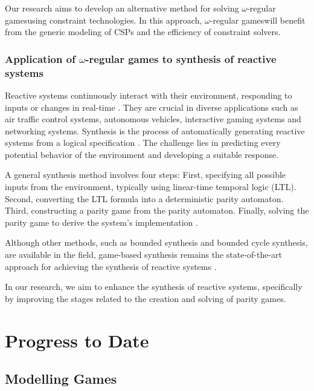 \documentclass{article}
\makeatletter
\newcommand{\wregulargames}{$\omega$-regular games\@ifnextchar{,}{}{\@ifnextchar{.}{}{ }}}
\makeatother
\begin{document}
Our research aims to develop an alternative method for solving \wregulargames using constraint technologies. In this approach, \wregulargames will benefit from the generic modeling of CSPs and the efficiency of constraint solvers.

\subsubsection{Application of $\omega$-regular games to synthesis of reactive systems}\label{sec:synthesisreactivesystems}

Reactive systems continuously interact with their environment, responding to inputs or changes in real-time \cite{finkbeiner2018,SohailSaqib2013Sfat}. They are crucial in diverse applications such as air traffic control systems, autonomous vehicles, interactive gaming systems and networking systems. Synthesis is the process of automatically generating reactive systems from a logical specification \cite{LuttenbergerMichael2020Psor,BruyereVeronique2022AGAf}. The challenge lies in predicting every potential behavior of the environment and developing a suitable response.

A general synthesis method involves four steps: First, specifying all possible inputs from the environment, typically using linear-time temporal logic (LTL). Second, converting the LTL formula into a deterministic parity automaton. Third, constructing a parity game from the parity automaton. Finally, solving the parity game to derive the system's implementation \cite{finkbeiner2018,LuttenbergerMichael2020Psor,BruyereVeronique2022AGAf}.

Although other methods, such as bounded synthesis and bounded cycle synthesis, are available in the field, game-based synthesis remains the state-of-the-art approach for achieving the synthesis of reactive systems \cite{finkbeiner2018,SohailSaqib2013Sfat}.

In our research, we aim to enhance the synthesis of reactive systems, specifically by improving the stages related to the creation and solving of parity games.


\section{Progress to Date}\label{sec:progresstodate}

\subsection{Modelling Games}\label{sec:modelling}
\end{document}
